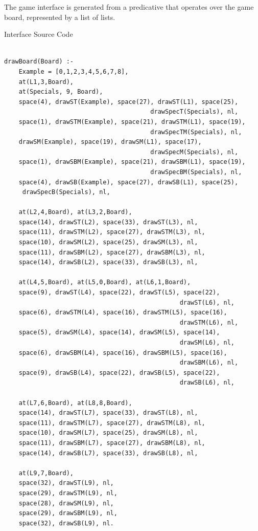 \documentclass[a4paper]{article}
\begin{document}
The game interface is generated from a predicative that operates over the game board, represented by a list of lists.

%

\renewcommand\listingscaption{Code}

\begin{listing}[!h]
    \caption{Interface Source Code}
    \label{Codigo:cod}
    \begin{verbatim}

drawBoard(Board) :-
    Example = [0,1,2,3,4,5,6,7,8],
    at(L1,3,Board),
    at(Specials, 9, Board),
    space(4), drawST(Example), space(27), drawST(L1), space(25),
                                        drawSpecT(Specials), nl,
    space(1), drawSTM(Example), space(21), drawSTM(L1), space(19),
                                        drawSpecTM(Specials), nl,
    drawSM(Example), space(19), drawSM(L1), space(17),
                                        drawSpecM(Specials), nl,
    space(1), drawSBM(Example), space(21), drawSBM(L1), space(19),
                                        drawSpecBM(Specials), nl,
    space(4), drawSB(Example), space(27), drawSB(L1), space(25),
     drawSpecB(Specials), nl,

    at(L2,4,Board), at(L3,2,Board),
    space(14), drawST(L2), space(33), drawST(L3), nl,
    space(11), drawSTM(L2), space(27), drawSTM(L3), nl,
    space(10), drawSM(L2), space(25), drawSM(L3), nl,
    space(11), drawSBM(L2), space(27), drawSBM(L3), nl,
    space(14), drawSB(L2), space(33), drawSB(L3), nl,

    at(L4,5,Board), at(L5,0,Board), at(L6,1,Board),
    space(9), drawST(L4), space(22), drawST(L5), space(22),
                                                drawST(L6), nl,
    space(6), drawSTM(L4), space(16), drawSTM(L5), space(16),
                                                drawSTM(L6), nl,
    space(5), drawSM(L4), space(14), drawSM(L5), space(14),
                                                drawSM(L6), nl,
    space(6), drawSBM(L4), space(16), drawSBM(L5), space(16),
                                                drawSBM(L6), nl,
    space(9), drawSB(L4), space(22), drawSB(L5), space(22),
                                                drawSB(L6), nl,

    at(L7,6,Board), at(L8,8,Board),
    space(14), drawST(L7), space(33), drawST(L8), nl,
    space(11), drawSTM(L7), space(27), drawSTM(L8), nl,
    space(10), drawSM(L7), space(25), drawSM(L8), nl,
    space(11), drawSBM(L7), space(27), drawSBM(L8), nl,
    space(14), drawSB(L7), space(33), drawSB(L8), nl,

    at(L9,7,Board),
    space(32), drawST(L9), nl,
    space(29), drawSTM(L9), nl,
    space(28), drawSM(L9), nl,
    space(29), drawSBM(L9), nl,
    space(32), drawSB(L9), nl.

\end{verbatim}

\end{listing}
\end{document}
